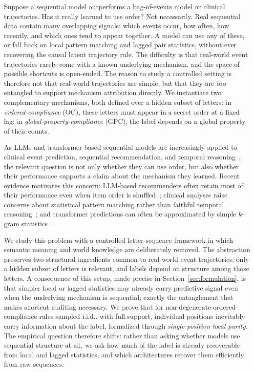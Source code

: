 \documentclass{article} %
\makeatletter
\def\@onedot{\ifx\@let@token.\else.\null\fi\xspace}
\def\onedot{\futurelet\@let@token\@onedot}
\def\iid{i.i.d\onedot} \def\wolog{w.l.o.g\onedot}
\theoremstyle{plain}
\theoremstyle{definition}
\theoremstyle{remark}
\makeatother
\begin{document}
Suppose a sequential model outperforms a bag-of-events model on clinical trajectories. Has it really learned to use order? Not necessarily. Real sequential data contain many overlapping signals: which events occur, how often, how recently, and which ones tend to appear together. A model can use any of these, or fall back on local pattern matching and lagged pair statistics, without ever recovering the causal latent trajectory rule. The difficulty is that real-world event trajectories rarely come with a known underlying mechanism, and the space of possible shortcuts is open-ended. The reason to study a controlled setting is therefore not that real-world trajectories are simple, but that they are too entangled to support mechanism attribution directly. We instantiate two complementary mechanisms, both defined over a hidden subset of letters: in \emph{ordered-compliance} (OC), these letters must appear in a secret order at a fixed lag; in \emph{global-property-compliance} (GPC), the label depends on a global property of their counts.

As LLMs and transformer-based sequential models are increasingly applied to clinical event prediction, sequential recommendation, and temporal reasoning~\citep{savcisens2024using,delphi2025transformer,li2020behrt,rasmy2021medbert,fatemiTESTTIMEBENCHMARK2025}, the relevant question is not only whether they can use order, but also whether their performance supports a claim about the mechanism they learned. Recent evidence motivates this concern: LLM-based recommenders often retain most of their performance even when item order is shuffled~\citep{kimLostSequenceLarge2025b}; clinical analyses raise concerns about statistical pattern matching rather than faithful temporal reasoning~\citep{bediFidelityMedicalReasoning2025}; and transformer predictions can often be approximated by simple $k$-gram statistics~\citep{nguyen2024understanding}.

We study this problem with a controlled letter-sequence framework in which semantic meaning and world knowledge are deliberately removed. The abstraction preserves two structural ingredients common to real-world event trajectories: only a hidden subset of letters is relevant, and labels depend on structure among those letters. A consequence of this setup, made precise in Section~\ref{sec:formulation}, is that simpler local or lagged statistics may already carry predictive signal even when the underlying mechanism is sequential; exactly the entanglement that makes shortcut auditing necessary. We prove that for non-degenerate ordered-compliance rules sampled \iid with full support, individual positions inevitably carry information about the label, formalized through \emph{single-position local purity}. The empirical question therefore shifts: rather than asking whether models use sequential structure at all, we ask how much of the label is already recoverable from local and lagged statistics, and which architectures recover them efficiently from raw sequences.
\end{document}
